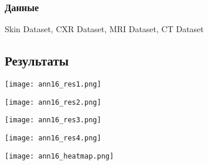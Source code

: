 \subsubsection*{Данные}
Skin Dataset, CXR Dataset, MRI Dataset, CT Dataset
\subsection*{Результаты}

\begin{minipage}{0.49\linewidth}
    \begin{center}
        \texttt{[image: ann16\_res1.png]} \\
    \end{center}
    
\end{minipage}
\begin{minipage}{0.49\linewidth}
    \begin{center}
        \texttt{[image: ann16\_res2.png]} \\
    \end{center}
    
\end{minipage} 


\begin{minipage}{0.49\linewidth}
    \begin{center}
        \texttt{[image: ann16\_res3.png]} \\
    \end{center}
    
\end{minipage}
\begin{minipage}{0.49\linewidth}
    \begin{center}
        \texttt{[image: ann16\_res4.png]} \\
    \end{center}
    
\end{minipage} 


\begin{minipage}{1.0\linewidth}
    \begin{center}
        \texttt{[image: ann16\_heatmap.png]} \\
    \end{center}
    
\end{minipage} 

